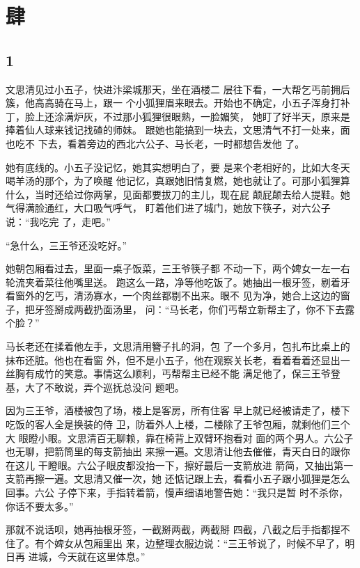 \section{肆}

{\centering\subsection{1}}

文思清见过小五子，快进汴梁城那天，坐在酒楼二
层往下看，一大帮乞丐前拥后簇，他高高骑在马上，跟一
个小狐狸眉来眼去。开始也不确定，小五子浑身打补
丁，脸上还涂满炉灰，不过那小狐狸很眼熟，一脸媚笑，
她盯了好半天，原来是捧着仙人球来钱记找碴的师妹。
跟她也能搞到一块去，文思清气不打一处来，面也吃不
下去，看着旁边的西北六公子、马长老，一时都想告发他
了。

她有底线的。小五子没记忆，她其实想明白了，要
是来个老相好的，比如大冬天喝羊汤的那个，为了唤醒
他记忆，真跟她旧情复燃，她也就让了。可那小狐狸算
什么，当时还给过你两掌，见面都要拔刀的主儿，现在屁
颠屁颠去给人提鞋。她气得满脸通红，大口吸气呼气，
盯着他们进了城门，她放下筷子，对六公子说：“我吃完
了，走吧。”

“急什么，三王爷还没吃好。”

她朝包厢看过去，里面一桌子饭菜，三王爷筷子都
不动一下，两个婢女一左一右轮流夹着菜往他嘴里送。
跑这么一路，净等他吃饭了。她抽出一根牙签，剔着牙
看窗外的乞丐，清汤寡水，一个肉丝都剔不出来。眼不
见为净，她合上这边的窗子，把牙签掰成两截扔面汤里，
问：“马长老，你们丐帮立新帮主了，你不下去露个脸？”

马长老还在揉着他左手，文思清用簪子扎的洞，包
了一个多月，包扎布比桌上的抹布还脏。他也在看窗
外，但不是小五子，他在观察关长老，看着看着还显出一
丝胸有成竹的笑意。事情这么顺利，丐帮帮主已经不能
满足他了，保三王爷登基，大了不敢说，弄个巡抚总没问
题吧。

因为三王爷，酒楼被包了场，楼上是客房，所有住客
早上就已经被请走了，楼下吃饭的客人全是换装的侍
卫，防着外人上楼，二楼除了王爷包厢，就剩他们三个大
眼瞪小眼。文思清百无聊赖，靠在椅背上双臂环抱看对
面的两个男人。六公子也无聊，把箭筒里的每支箭抽出
来擦一遍。文思清让他去催催，青天白日的跟你在这儿
干瞪眼。六公子眼皮都没抬一下，擦好最后一支箭放进
箭简，又抽出第一支箭再擦一遍。文思清又催一次，她
还惦记跟上去，看看小五子跟小狐狸是怎么回事。六公
子停下来，手指转着箭，慢声细语地警告她：“我只是暂
时不杀你，你话不要太多。”

那就不说话呗，她再抽根牙签，一截掰两截，两截掰
四截，八截之后手指都捏不住了。有个婢女从包厢里出
来，边整理衣服边说：“三王爷说了，时候不早了，明日再
进城，今天就在这里体息。”

